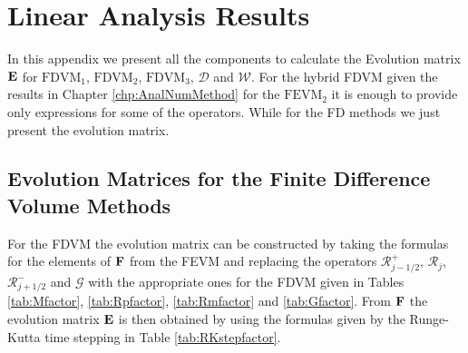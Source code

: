 \chapter{Linear Analysis Results}
\label{app:LinAnal}
In this appendix we present all the components to calculate the Evolution matrix $\mathbf{E}$ for $\text{FDVM}_1$, $\text{FDVM}_2$, $\text{FDVM}_3$, $\mathcal{D}$ and $\mathcal{W}$. For the hybrid FDVM given the results in Chapter \ref{chp:AnalNumMethod} for the $\text{FEVM}_2$ it is enough to provide only expressions for some of the operators. While for the FD methods we just present the evolution matrix.  

\section{Evolution Matrices for the Finite Difference Volume Methods}
For the FDVM the evolution matrix can be constructed by taking the formulas for the elements of $\mathbf{F}$ from the FEVM and replacing the operators $\mathcal{R}^+_{j-1/2}$, $\mathcal{R}_j$, $\mathcal{R}^-_{j+1/2}$ and $\mathcal{G}$ with the appropriate ones for the FDVM given in Tables \ref{tab:Mfactor}, \ref{tab:Rpfactor}, \ref{tab:Rmfactor} and \ref{tab:Gfactor}. From $\mathbf{F}$ the evolution matrix $\mathbf{E}$ is then obtained by using the formulas given by the Runge-Kutta time stepping in Table \ref{tab:RKstepfactor}. 



